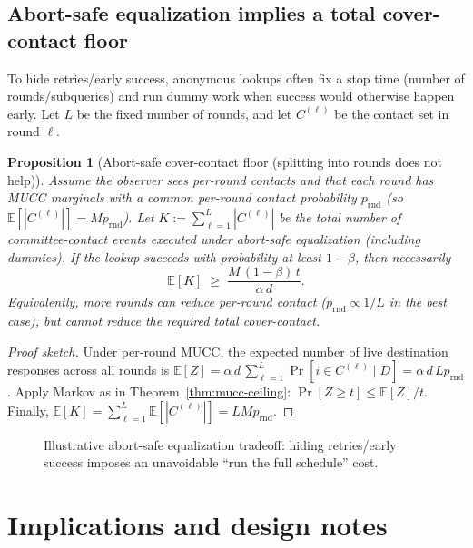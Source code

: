 \documentclass[11pt]{article}
\newtheorem{proposition}{Proposition}
\newcommand{\E}{\mathbb{E}}
\begin{document}
\subsection{Abort-safe equalization implies a total cover-contact floor}
To hide retries/early success, anonymous lookups often fix a stop time (number of rounds/subqueries) and run dummy work when success would otherwise happen early.
Let $L$ be the fixed number of rounds, and let $C^{(\ell)}$ be the contact set in round $\ell$.

\begin{proposition}[Abort-safe cover-contact floor (splitting into rounds does not help)]
\label{prop:mucc-stop-time-floor}
Assume the observer sees per-round contacts and that each round has MUCC marginals with a common per-round contact probability $p_{\mathrm{rnd}}$ (so $\E[|C^{(\ell)}|]=Mp_{\mathrm{rnd}}$).
Let $K:=\sum_{\ell=1}^L |C^{(\ell)}|$ be the total number of committee-contact events executed under abort-safe equalization (including dummies).
If the lookup succeeds with probability at least $1-\beta$, then necessarily
\[
\E[K] \;\ge\; \frac{M\,(1-\beta)\,t}{\alpha\,d}.
\]
Equivalently, more rounds can reduce per-round contact ($p_{\mathrm{rnd}}\propto 1/L$ in the best case), but cannot reduce the required \emph{total} cover-contact.
\end{proposition}

\begin{proof}[Proof sketch]
Under per-round MUCC, the expected number of live destination responses across all rounds is
$\E[Z]=\alpha\,d\,\sum_{\ell=1}^L \Pr[i\in C^{(\ell)}\mid D] = \alpha\,d\,L p_{\mathrm{rnd}}$.
Apply Markov as in Theorem~\ref{thm:mucc-ceiling}: $\Pr[Z\ge t]\le \E[Z]/t$.
Finally, $\E[K]=\sum_{\ell=1}^L \E[|C^{(\ell)}|]=L M p_{\mathrm{rnd}}$.
\end{proof}

\begin{figure}[t]
  \centering
  \caption{Illustrative abort-safe equalization tradeoff: hiding retries/early success imposes an unavoidable ``run the full schedule'' cost.}
  \label{fig:abort-eq}
\end{figure}


\section{Implications and design notes}
\label{sec:implications}
\end{document}

